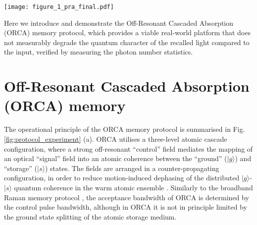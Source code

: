 \documentclass[%
 reprint,
 amsmath,amssymb,
 aps,
 pra,
]{revtex4-1}
\begin{document}
\begin{figure*}[t]
\texttt{[image: figure\_1\_pra\_final.pdf]}
\caption{\textbf{The ORCA protocol and experimental setup.}
%
(a) The ORCA protocol. (left) Storage: a weak input signal pulse and strong read-in control pulse are overlapped counter-propagating in an atomic vapour. The broadband fields are on two-photon resonance with a doubly-excited state $|s\rangle$, while being far-detuned from the intermediate state $|e\rangle$. (center) The storage maps the input signal to a collective atomic coherence (yellow twisted line) between the ground state $|g\rangle$ and $|s\rangle$. (right) Recall: applying a read-out control pulse after the desired storage time leads to a re-mapping of the atomic coherence back into an optical field and thus re-emission of the signal in the forward direction. 
%
(b) The relevant atomic levels in the current experimental implementation in warm caesium vapour. Under broadband excitation the atomic configuration can be treated to first order as a three-level system \cite{Huber2011}.
%
(c) Schematic of the setup (see text for more details). Ti:sapphire - mode-locked titanium sapphire laser; FM - flip mirror; SHG - second harmonic crystal; PDC - waveguide photon source; FP - Fabry-Per\'ot etalons with total transmission bandwidth of $\sim1$ GHz; PC - pulse picker; PBS - polarising beamsplitter; D$_\mathrm{i}$ - single-photon avalanche photodiode (APD) detector for the idler; DM - dichroic mirror; BS - beamsplitter; ORCA - caesium cell; D$_\mathrm{s1}$, D$_\mathrm{s2}$ - single-photon APDs for the signal.
}
\label{fig:protocol_experiment}
\end{figure*}

Here we introduce and demonstrate the Off-Resonant Cascaded Absorption (ORCA) memory protocol, which provides a viable real-world platform that does not measurably degrade the quantum character of the recalled light compared to the input, verified by measuring the photon number statistics.

\section{Off-Resonant Cascaded Absorption (ORCA) memory}

The operational principle of the ORCA memory protocol is summarised in Fig. \ref{fig:protocol_experiment} (a). ORCA utilises a three-level atomic cascade configuration, where a strong off-resonant ``control'' field mediates the mapping of an optical ``signal'' field into an atomic coherence between the ``ground'' ($|g\rangle$) and ``storage'' ($|s\rangle$) states. The fields are arranged in a counter-propagating configuration, in order to reduce motion-induced dephasing of the distributed $|g\rangle$-$|s\rangle$ quantum coherence in the warm atomic ensemble \cite{Zhao2009}. Similarly to the broadband Raman memory protocol \cite{Reim2010a}, the acceptance bandwidth of ORCA is determined by the control pulse bandwidth, although in ORCA it is not in principle limited by the ground state splitting of the atomic storage medium.
\end{document}
